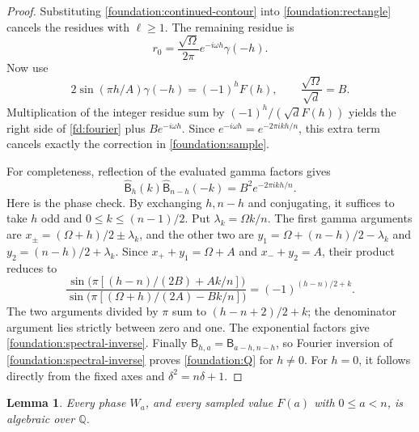 \documentclass[11pt]{article}
\numberwithin{equation}{section}
\newtheorem{lemma}[theorem]{Lemma}
\theoremstyle{definition}
\theoremstyle{remark}
\begin{document}
\begin{proof}
Substituting \eqref{foundation:continued-contour} into
\eqref{foundation:rectangle} cancels the residues with $\ell\geq1$.
The remaining residue is
\[
 r_0=\frac{\sqrt\Omega}{2\pi}e^{-i\omega h}\gamma(-h).
\]
Now use
\[
 2\sin(\pi h/A)\gamma(-h)=(-1)^hF(h),\qquad
 \frac{\sqrt\Omega}{\sqrt d}=B.
\]
Multiplication of the integer residue sum by
$(-1)^h/(\sqrt d F(h))$ yields the right side of
\eqref{fd:fourier} plus $Be^{-i\omega h}$.
Since $e^{-i\omega h}=e^{-2\pi ikh/n}$, this extra term cancels
exactly the correction in \eqref{foundation:sample}.

For completeness, reflection of the evaluated gamma factors gives
\begin{equation}\label{foundation:spectral-inverse}
 \widehat{\mathsf B}_h(k)\widehat{\mathsf B}_{n-h}(-k)
 =B^2e^{-2\pi ikh/n}.
\end{equation}
Here is the phase check. By exchanging $h,n-h$ and conjugating,
it suffices to take $h$ odd and $0\leq k\leq(n-1)/2$.
Put $\lambda_k=\Omega k/n$. The first gamma arguments are
$x_\pm=(\Omega+h)/2\pm\lambda_k$, and the other two are
$y_1=\Omega+(n-h)/2-\lambda_k$ and
$y_2=(n-h)/2+\lambda_k$. Since
$x_++y_1=\Omega+A$ and $x_-+y_2=A$, their product reduces to
\[
 \frac{\sin\bigl(\pi[(h-n)/(2B)+Ak/n]\bigr)}
      {\sin\bigl(\pi[(\Omega+h)/(2A)-Bk/n]\bigr)}
 =(-1)^{(h-n)/2+k}.
\]
The two arguments divided by $\pi$ sum to $(h-n+2)/2+k$;
the denominator argument lies strictly between zero and one.
The exponential factors give \eqref{foundation:spectral-inverse}.
Finally $\mathsf B_{h,a}=\mathsf B_{a-h,n-h}$, so Fourier inversion
of \eqref{foundation:spectral-inverse} proves
\eqref{foundation:Q} for $h\ne0$. For $h=0$, it follows directly
from the fixed axes and $\delta^2=n\delta+1$.
\end{proof}

\begin{lemma}\label{foundation:algebraicity}
Every phase $W_a$, and every sampled value $F(a)$ with $0\leq a<n$,
is algebraic over $\mathbb Q$.
\end{lemma}
\end{document}

